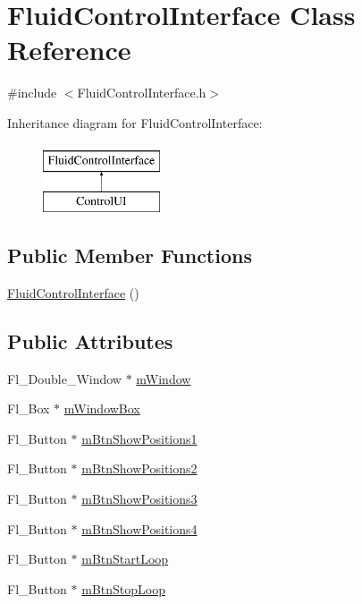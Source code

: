 \hypertarget{class_fluid_control_interface}{}\section{Fluid\+Control\+Interface Class Reference}
\label{class_fluid_control_interface}


{\ttfamily \#include $<$Fluid\+Control\+Interface.\+h$>$}

Inheritance diagram for Fluid\+Control\+Interface\+:\begin{figure}[H]
\begin{center}
\leavevmode
\includegraphics[height=2.000000cm]{class_fluid_control_interface}
\end{center}
\end{figure}
\subsection*{Public Member Functions}
\begin{DoxyCompactItemize}
\item 
\hyperlink{class_fluid_control_interface_a4cb172a43e95b2852f30807e9037a9d9}{Fluid\+Control\+Interface} ()
\end{DoxyCompactItemize}
\subsection*{Public Attributes}
\begin{DoxyCompactItemize}
\item 
Fl\+\_\+\+Double\+\_\+\+Window $\ast$ \hyperlink{class_fluid_control_interface_a94da1536108cd2bd24edefd8711ca510}{m\+Window}
\item 
Fl\+\_\+\+Box $\ast$ \hyperlink{class_fluid_control_interface_aad9032c096ff2feb1c72f534012282c9}{m\+Window\+Box}
\item 
Fl\+\_\+\+Button $\ast$ \hyperlink{class_fluid_control_interface_adc41c1528cbec12780e89140de2f8913}{m\+Btn\+Show\+Positions1}
\item 
Fl\+\_\+\+Button $\ast$ \hyperlink{class_fluid_control_interface_a3d74260a0b459e570427438dc5077db0}{m\+Btn\+Show\+Positions2}
\item 
Fl\+\_\+\+Button $\ast$ \hyperlink{class_fluid_control_interface_aedea42f561d246eb95442e13a88f8d23}{m\+Btn\+Show\+Positions3}
\item 
Fl\+\_\+\+Button $\ast$ \hyperlink{class_fluid_control_interface_a3827651fb223790ca880f23312266dde}{m\+Btn\+Show\+Positions4}
\item 
Fl\+\_\+\+Button $\ast$ \hyperlink{class_fluid_control_interface_a7d1930c1f10db9e39ce691f504b81387}{m\+Btn\+Start\+Loop}
\item 
Fl\+\_\+\+Button $\ast$ \hyperlink{class_fluid_control_interface_a885b36cf5c6e5ab82a2b6636579d840e}{m\+Btn\+Stop\+Loop}
\end{DoxyCompactItemize}


